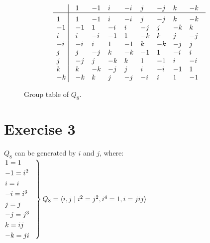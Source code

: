 \documentclass[12pt]{article}
\begin{document}
    \begin{figure}[H]
        \centering

        \[\vbox{\tabskip0.5em\offinterlineskip
        \halign{\strut$#$\hfil\ \tabskip1em\vrule&&$#$\hfil\cr
        ~   & 1 & -1 & i & -i & j & -j & k & -k \cr
        \noalign{\hrule}\vrule height 12pt width 0pt
        1 & 1 & -1 & i & -i & j & -j & k & -k \cr
        -1 & -1 & 1 & -i & i & -j & j & -k & k \cr
        i & i & -i & -1 & 1 & -k & k & j & -j \cr
        -i & -i & i & 1 & -1 & k & -k & -j & j \cr
        j & j & -j & k & -k & -1 & 1 & -i & i \cr
        j & -j & j & -k & k & 1 & -1 & i & -i \cr
        k & k & -k & -j & j & i & -i & -1 & 1 \cr
        -k & -k & k & j & -j & -i & i & 1 & -1 \cr
        }}\]

        \caption{\label{fig:figure1} Group table of $Q_8$.}
    \end{figure}


    \section*{Exercise 3}
    $Q_8$ can be generated by $i$ and $j$, where: \\
    $\begin{rcases}
    1 = 1 \hspace{2em} \\
    -1 = i^2 \\
    i = i \\
    -i = i^3 \\
    j = j \\
    -j = j^3 \\
    k = ij \\
    -k = ji \\
    \end{rcases} Q_8 = \langle i, j
    \mid i^2 = j^2, i^4 = 1, i = jij \rangle$ \\
\end{document}
